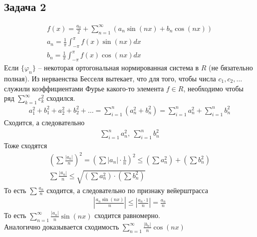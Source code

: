 \subsection*{Задача 2}
	\begin{gather*}
		f(x)
		= \frac{a_0}{2} + \sum\limits_{n = 1}^{\infty} (a_n \sin(nx) + b_n \cos(nx))\\
		a_n = \frac{1}{\pi} \int_{-\pi}^{\pi} f(x) \sin(nx)dx\\
		b_n = \frac{1}{\pi} \int_{-\pi}^{\pi} f(x) \cos(nx)dx
	\end{gather*}
	Если $\{\varphi_n\}$ -- некоторая ортогональная нормированная система в $R$ (не бязательно полная). Из нерваенства Бесселя вытекает, что для того, чтобы числа $c_1, c_2, \ldots$ служили коэффициентами Фурье какого-то элемента $f \in R$, необходимо чтобы ряд $\sum\limits_{k = 1}^{\infty} c_k^2$ сходился.\\
	\begin{gather*}
		a_1^2 + b_1^2 + a_2^2 + b_2^2 + \ldots 
		= \sum\limits_{i = 1}^{n} (a_n^2 + b_n^2)
		= \sum\limits_{i = 1}^{n} a_n^2 + \sum\limits_{i = 1}^{n} b_n^2
	\end{gather*}
	Сходится, а следовательно
	\begin{gather*}
		\sum\limits_{i = 1}^{n} a_n^2,\ \sum\limits_{i = 1}^{n} b_n^2
	\end{gather*}
	Тоже сходятся
	\vskip 0.1in
	\begin{gather*}
		\left(\sum \frac{|a_n|}{n}\right)^2
		= \left(\sum |a_n| \cdot \frac{1}{n}\right)^2
		\leqslant \left(\sum a_n^2\right) + \left(\sum b_n^2 \right)\\
		\sum \frac{|a_n|}{n}
		\leqslant \sqrt{\left(\sum a_n^2 \right) \cdot \left(\sum b_n^2\right)}
	\end{gather*}
	То есть $\sum \frac{a_n}{n}$ сходится, а следовательно по признаку вейерштрасса
	\begin{gather*}
		\left| \frac{a_n \sin(nx)}{n} \right|
		\leqslant \left| \frac{a_n \cdot 1}{n} \right|
		= \frac{a_n}{n}
	\end{gather*}
	То есть $\sum\limits_{n=1}^{\infty} \frac{|a_n|}{n} \sin(nx)$ сходится равномерно.\\
	Аналогично доказывается сходимость $\sum\limits_{n=1}^{\infty} \frac{|b_n|}{n} \cos(nx)$
\vskip 0.4in

